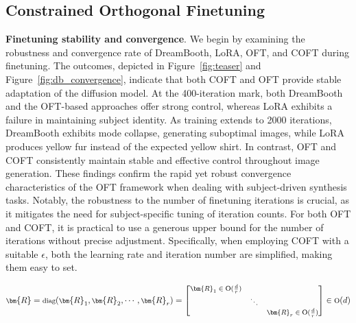 \subsection{Constrained Orthogonal Finetuning}

\textbf{Finetuning stability and convergence}. We begin by examining the robustness and convergence rate of DreamBooth, LoRA, OFT, and COFT during finetuning. The outcomes, depicted in Figure~\ref{fig:teaser} and Figure~\ref{fig:db_convergence}, indicate that both COFT and OFT provide stable adaptation of the diffusion model. At the 400-iteration mark, both DreamBooth and the OFT-based approaches offer strong control, whereas LoRA exhibits a failure in maintaining subject identity. As training extends to 2000 iterations, DreamBooth exhibits mode collapse, generating suboptimal images, while LoRA produces yellow fur instead of the expected yellow shirt. In contrast, OFT and COFT consistently maintain stable and effective control throughout image generation. These findings confirm the rapid yet robust convergence characteristics of the OFT framework when dealing with subject-driven synthesis tasks. Notably, the robustness to the number of finetuning iterations is crucial, as it mitigates the need for subject-specific tuning of iteration counts. For both OFT and COFT, it is practical to use a generous upper bound for the number of iterations without precise adjustment. Specifically, when employing COFT with a suitable $\epsilon$, both the learning rate and iteration number are simplified, making them easy to set.

\begin{equation}
    \footnotesize
    \bm{R}=\text{diag}(\bm{R}_1,\bm{R}_2,\cdots,\bm{R}_r)=\begin{bmatrix}
    \bm{R}_1\in \text{O}(\frac{d}{r}) &  &\\
    &\ddots & \\
    & & \bm{R}_r\in \text{O}(\frac{d}{r})
    \end{bmatrix}\in \text{O}(d)
\end{equation}

